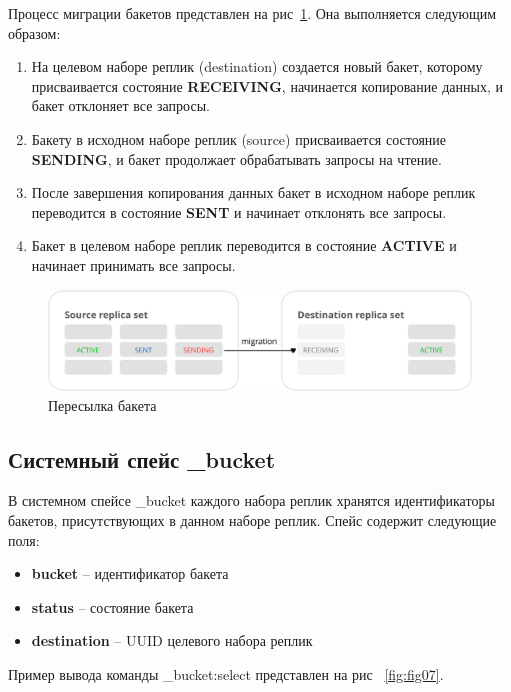 Процесс миграции бакетов представлен на рис~\ref{fig:fig06}. Она выполняется
следующим образом:

\begin{enumerate}
\item На целевом наборе реплик (destination) создается новый бакет, которому
    присваивается состояние \textbf{RECEIVING}, начинается копирование данных,
        и бакет отклоняет все запросы.
\item Бакету в исходном наборе реплик (source) присваивается состояние
    \textbf{SENDING}, и бакет продолжает обрабатывать запросы на чтение.
\item После завершения копирования данных бакет в исходном наборе реплик
    переводится в состояние \textbf{SENT} и начинает отклонять все запросы.
\item Бакет в целевом наборе реплик переводится в состояние \textbf{ACTIVE} и
    начинает принимать все запросы.
\end{enumerate}

\begin{figure}
  \centering
  \includegraphics[scale=0.35]{inc/states.svg}
  \caption{Пересылка бакета}
  \label{fig:fig06}
\end{figure}

\subsection{Системный спейс _bucket}

В системном спейсе _bucket каждого набора реплик хранятся идентификаторы
бакетов, присутствующих в данном наборе реплик. Спейс содержит следующие поля:

\begin{itemize}
\item \textbf{bucket} -- идентификатор бакета
\item \textbf{status} -- состояние бакета
\item \textbf{destination} -- UUID целевого набора реплик
\end{itemize}

Пример вывода команды _bucket:select{} представлен на рис ~\ref{fig:fig07}.

